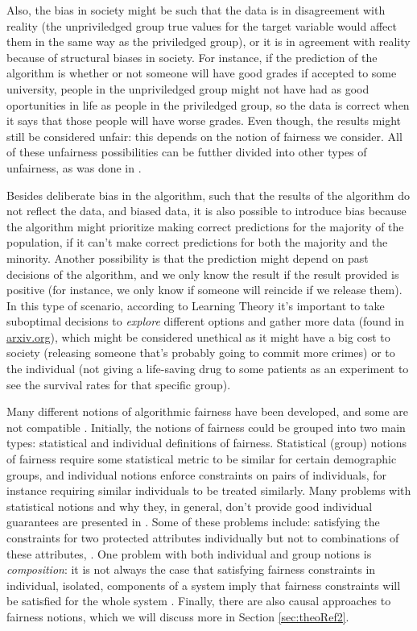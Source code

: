 Also, the bias in society might be such that the data is in disagreement with reality (the unpriviledged group true values for the target variable would affect them in the same way as the priviledged group), or it is in agreement with reality because of structural biases in society. For instance, if the prediction of the algorithm is whether or not someone will have good grades if accepted to some university, people in the unpriviledged group might not have had as good oportunities in life as people in the priviledged group, so the data is correct when it says that those people will have worse grades. Even though, the results might still be considered unfair: this depends on the notion of fairness we consider. All of these unfairness possibilities can be futther divided into other types of unfairness, as was done in \cite{mehrabi2021survey}.

Besides deliberate bias in the algorithm, such that the results of the algorithm do not reflect the data, and biased data, it is also possible to introduce bias because the algorithm might prioritize making correct predictions for the majority of the population, if it can't make correct predictions for both the majority and the minority. Another possibility is that the prediction might depend on past decisions of the algorithm, and we only know the result if the result provided is positive (for instance, we only know if someone will reincide if we release them). In this type of scenario, according to Learning Theory it's important to take suboptimal decisions to \emph{explore} different options and gather more data \cite{chouldechova2018frontiers} (found in \url{arxiv.org}), which might be considered unethical as it might have a big cost to society (releasing someone that's probably going to commit more crimes) or to the individual (not giving a life-saving drug to some patients as an experiment to see the survival rates for that specific group). 

Many different notions of algorithmic fairness have been developed, and some are not compatible \cite{alves2023survey}. Initially, the notions of fairness could be grouped into two main types: statistical and individual definitions of fairness\cite{chouldechova2018frontiers}. Statistical (group) notions of fairness require some statistical metric to be similar for certain demographic groups, and individual notions enforce constraints on pairs of individuals, for instance requiring similar individuals to be treated similarly. Many problems with statistical notions and why they, in general, don't provide good individual guarantees are presented in \cite{Awareness}\cite{kearns2018preventing}. Some of these problems include: satisfying the constraints for two protected attributes individually but not to combinations of these attributes, . One problem with both individual and group notions is \emph{composition}: it is not always the case that satisfying fairness constraints in individual, isolated, components of a system imply that fairness constraints will be satisfied for the whole system \cite{dwork2018fairness}. Finally, there are also causal approaches to fairness notions, which we will discuss more in Section \ref{sec:theoRef2}.


